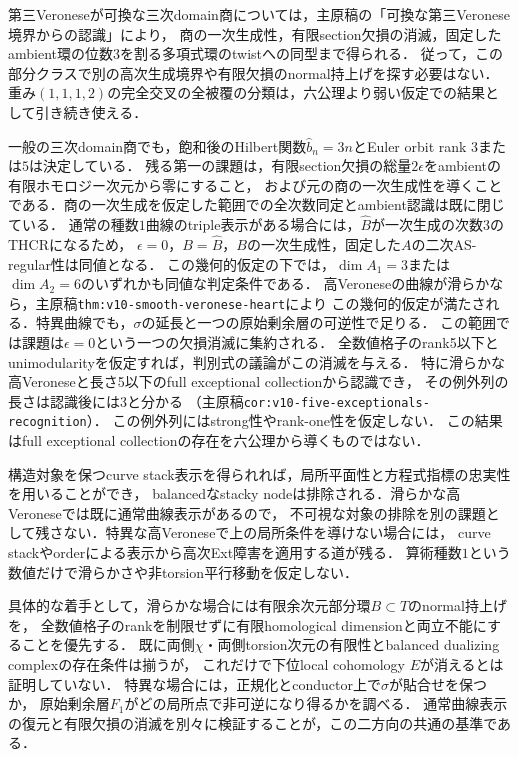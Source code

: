 \documentclass[11pt,a4paper]{ltjsarticle}
\begin{document}
第三Veroneseが可換な三次domain商については，主原稿の「可換な第三Veronese境界からの認識」により，
商の一次生成性，有限section欠損の消滅，固定したambient環の位数$3$を割る多項式環のtwistへの同型まで得られる．
従って，この部分クラスで別の高次生成境界や有限欠損のnormal持上げを探す必要はない．
重み$(1,1,1,2)$の完全交叉の全被覆の分類は，六公理より弱い仮定での結果として引き続き使える．

一般の三次domain商でも，飽和後のHilbert関数$\widehat b_n=3n$とEuler orbit rank $3$または$5$は決定している．
残る第一の課題は，有限section欠損の総量$2\epsilon$をambientの有限ホモロジー次元から零にすること，
および元の商の一次生成性を導くことである．商の一次生成を仮定した範囲での全次数同定とambient認識は既に閉じている．
通常の種数$1$曲線のtriple表示がある場合には，$\widehat B$が一次生成の次数$3$のTHCRになるため，
$\epsilon=0$，$B=\widehat B$，$B$の一次生成性，固定した$A$の二次AS-regular性は同値となる．
この幾何的仮定の下では，$\dim A_1=3$または$\dim A_2=6$のいずれかも同値な判定条件である．
高Veroneseの曲線が滑らかなら，主原稿\texttt{thm:v10-smooth-veronese-heart}により
この幾何的仮定が満たされる．特異曲線でも，$\sigma$の延長と一つの原始剰余層の可逆性で足りる．
この範囲では課題は$\epsilon=0$という一つの欠損消滅に集約される．
全数値格子のrank5以下とunimodularityを仮定すれば，判別式の議論がこの消滅を与える．
特に滑らかな高Veroneseと長さ5以下のfull exceptional collectionから認識でき，
その例外列の長さは認識後には3と分かる
（主原稿\texttt{cor:v10-five-exceptionals-recognition}）．
この例外列にはstrong性やrank-one性を仮定しない．
この結果はfull exceptional collectionの存在を六公理から導くものではない．

構造対象を保つcurve stack表示を得られれば，局所平面性と方程式指標の忠実性を用いることができ，
balancedなstacky nodeは排除される．滑らかな高Veroneseでは既に通常曲線表示があるので，
不可視な対象の排除を別の課題として残さない．特異な高Veroneseで上の局所条件を導けない場合には，
curve stackやorderによる表示から高次Ext障害を適用する道が残る．
算術種数$1$という数値だけで滑らかさや非torsion平行移動を仮定しない．

具体的な着手として，滑らかな場合には有限余次元部分環$B\subset T$のnormal持上げを，
全数値格子のrankを制限せずに有限homological dimensionと両立不能にすることを優先する．
既に両側$\chi$・両側torsion次元の有限性とbalanced dualizing complexの存在条件は揃うが，
これだけで下位local cohomology $E$が消えるとは証明していない．
特異な場合には，正規化とconductor上で$\sigma$が貼合せを保つか，
原始剰余層$F_1$がどの局所点で非可逆になり得るかを調べる．
通常曲線表示の復元と有限欠損の消滅を別々に検証することが，この二方向の共通の基準である．
\end{document}
